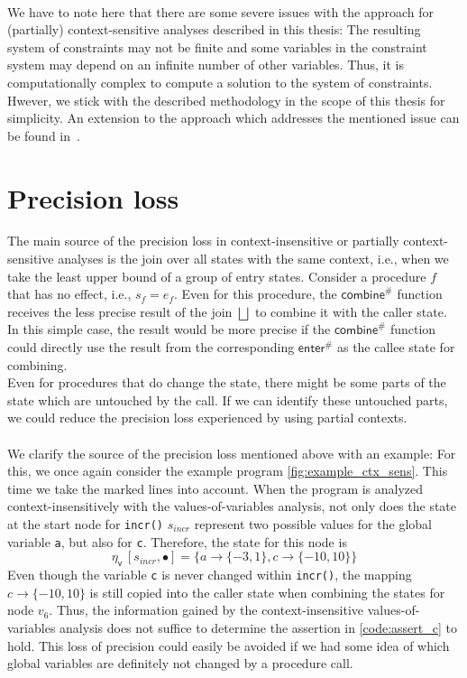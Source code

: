     \\
    We have to note here that there are some severe issues with the approach for (partially) context-sensitive analyses described in this thesis: The resulting system of constraints may not be finite and some variables in the constraint system may depend on an infinite number of other variables. Thus, it is computationally complex to compute a solution to the system of constraints. Hwever, we stick with the described methodology in the scope of this thesis for simplicity. An extension to the approach which addresses the mentioned issue can be found in~\parencite{apinis2012side}.

  \section{Precision loss}\label{sec:precisionLoss}
    The main source of the precision loss in context-insensitive or partially context-sensitive analyses is the join over all states with the same context, i.e., when we take the least upper bound of a group of entry states. Consider a procedure $f$ that has no effect, i.e., $s_f = e_f$. Even for this procedure, the $\textsf{combine}^{\#}$ function receives the less precise result of the join $\bigsqcup$ to combine it with the caller state. In this simple case, the result would be more precise if the $\textsf{combine}^{\#}$ function could directly use the result from the corresponding $\textsf{enter}^{\#}$ as the callee state for combining.\\
    Even for procedures that do change the state, there might be some parts of the state which are untouched by the call. If we can identify these untouched parts, we could reduce the precision loss experienced by using partial contexts.\\
    \\
    We clarify the source of the precision loss mentioned above with an example: For this, we once again consider the example program \autoref{fig:example_ctx_sens}. This time we take the marked lines into account. When the program is analyzed context-insensitively with the values-of-variables analysis, not only does the state at the start node for \texttt{incr()} $s_{incr}$ represent two possible values for the global variable \texttt{a}, but also for \texttt{c}. Therefore, the state for this node is
    \[\eta_\textsf{v}\ [s_{incr}, \bullet] = \{a \rightarrow \{-3, 1\}, c \rightarrow \{-10, 10\}\} \]
    Even though the variable \texttt{c} is never changed within \texttt{incr()}, the mapping $c \rightarrow \{-10, 10\}$ is still copied into the caller state when combining the states for node $v_6$. Thus, the information gained by the context-insensitive values-of-variables analysis does not suffice to determine the assertion in \autoref{code:assert_c} to hold. This loss of precision could easily be avoided if we had some idea of which global variables are definitely not changed by a procedure call.


